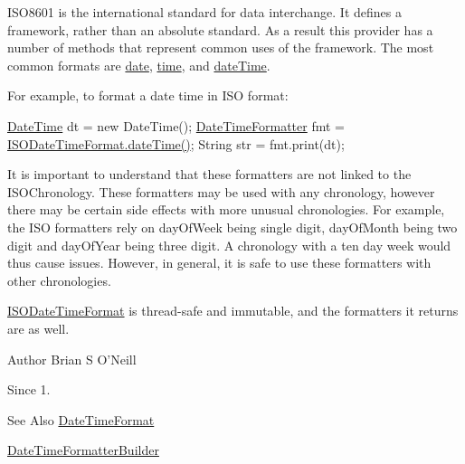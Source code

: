 I\-S\-O8601 is the international standard for data interchange. It defines a framework, rather than an absolute standard. As a result this provider has a number of methods that represent common uses of the framework. The most common formats are \hyperlink{classorg_1_1joda_1_1time_1_1format_1_1_i_s_o_date_time_format_ac71af973d15902ba7c4764224cfbb7cb}{date}, \hyperlink{classorg_1_1joda_1_1time_1_1format_1_1_i_s_o_date_time_format_a782141b660556509d76a16a322c74dad}{time}, and \hyperlink{classorg_1_1joda_1_1time_1_1format_1_1_i_s_o_date_time_format_a7d87ac550d9b9641d8b920fc539bb9ce}{date\-Time}. 

For example, to format a date time in I\-S\-O format\-: 
\begin{DoxyPre}
\hyperlink{classorg_1_1joda_1_1time_1_1_date_time}{DateTime} dt = new DateTime();
\hyperlink{classorg_1_1joda_1_1time_1_1format_1_1_date_time_formatter}{DateTimeFormatter} fmt = \hyperlink{classorg_1_1joda_1_1time_1_1format_1_1_i_s_o_date_time_format_a7d87ac550d9b9641d8b920fc539bb9ce}{ISODateTimeFormat.dateTime()};
String str = fmt.print(dt);
\end{DoxyPre}
 

It is important to understand that these formatters are not linked to the {\ttfamily I\-S\-O\-Chronology}. These formatters may be used with any chronology, however there may be certain side effects with more unusual chronologies. For example, the I\-S\-O formatters rely on day\-Of\-Week being single digit, day\-Of\-Month being two digit and day\-Of\-Year being three digit. A chronology with a ten day week would thus cause issues. However, in general, it is safe to use these formatters with other chronologies. 

\hyperlink{classorg_1_1joda_1_1time_1_1format_1_1_i_s_o_date_time_format}{I\-S\-O\-Date\-Time\-Format} is thread-\/safe and immutable, and the formatters it returns are as well.

\begin{DoxyAuthor}{Author}
Brian S O'Neill 
\end{DoxyAuthor}
\begin{DoxySince}{Since}
1. 
\end{DoxySince}
\begin{DoxySeeAlso}{See Also}
\hyperlink{classorg_1_1joda_1_1time_1_1format_1_1_date_time_format}{Date\-Time\-Format} 

\hyperlink{classorg_1_1joda_1_1time_1_1format_1_1_date_time_formatter_builder}{Date\-Time\-Formatter\-Builder} 
\end{DoxySeeAlso}


